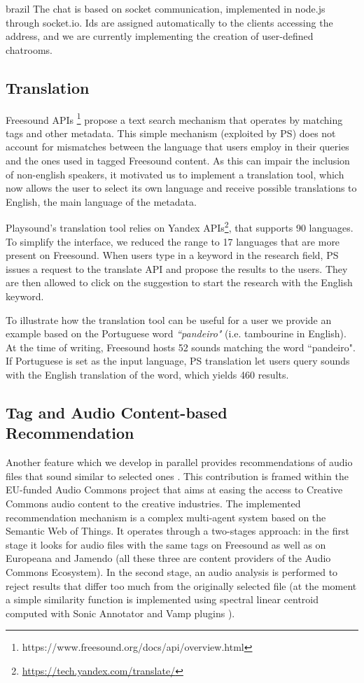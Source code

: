 \begin{otherlanguage*}{brazil}
The chat is based on socket communication, implemented in node.js through socket.io. Ids are assigned automatically to the clients accessing the address, and we are currently implementing the creation of user-defined chatrooms.

\subsection{Translation}

Freesound APIs \footnote{https://www.freesound.org/docs/api/overview.html} propose a text search mechanism that operates by matching tags and other metadata. This simple mechanism (exploited by PS) does not account for mismatches between the language that users employ in their queries and the ones used in tagged Freesound content. As this can impair the inclusion of non-english speakers, it motivated us to implement a translation tool, which now allows the user to select its own language and receive possible translations to English, the main language of the metadata. 

Playsound's translation tool relies on Yandex APIs\footnote{\url{https://tech.yandex.com/translate/}}, that supports 90 languages. To simplify the interface, we reduced the range to 17 languages that are more present on Freesound. When users type in a keyword in the research field, PS issues a request to the translate API and propose the results to the users. They are then allowed to click on the suggestion to start the research with the English keyword.

To illustrate how the translation tool can be useful for a user we provide an example based on the Portuguese word \textit{``pandeiro"} (i.e. tambourine in English). At the time of writing, Freesound hosts 52 sounds matching the word ``pandeiro". If Portuguese is set as the input language, PS translation let users query sounds with the English translation of the word, which yields 460 results.

\subsection{Tag and Audio Content-based Recommendation}

Another feature which we develop in parallel provides recommendations of audio files that sound similar to selected ones \cite{Viola2018}. This contribution is framed within the EU-funded Audio Commons project that aims at easing the access to Creative Commons audio content to the creative industries. The implemented recommendation mechanism is a complex multi-agent system based on the Semantic Web of Things. It operates through a two-stages approach: in the first stage it looks for audio files with the same tags on Freesound as well as on Europeana and Jamendo (all these three are content providers of the Audio Commons Ecosystem). In the second stage, an audio analysis is performed to reject results that differ too much from the originally selected file (at the moment a simple similarity function is implemented using spectral linear centroid computed with Sonic Annotator and Vamp plugins \cite{Cannam2010}).


\end{otherlanguage*}
